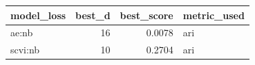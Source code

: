 \begin{tabular}{lrrl}
\toprule
model\_loss & best\_d & best\_score & metric\_used \\
\midrule
ae:nb & 16 & 0.0078 & ari \\
scvi:nb & 10 & 0.2704 & ari \\
\bottomrule
\end{tabular}
